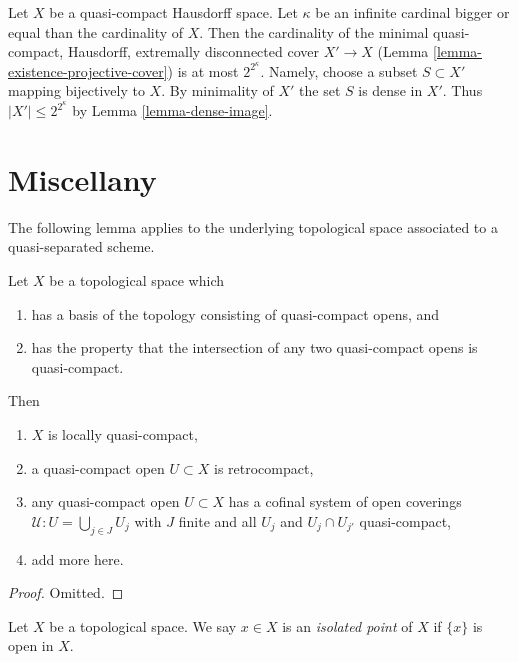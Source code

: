 \begin{remark}
\label{remark-size-projective-cover}
Let $X$ be a quasi-compact Hausdorff space. Let $\kappa$ be an infinite
cardinal bigger or equal than the cardinality of $X$. Then the cardinality
of the minimal quasi-compact, Hausdorff, extremally disconnected cover
$X' \to X$ (Lemma \ref{lemma-existence-projective-cover})
is at most $2^{2^\kappa}$. Namely, choose a subset $S \subset X'$
mapping bijectively to $X$. By minimality of $X'$ the set $S$ is dense
in $X'$. Thus $|X'| \leq 2^{2^\kappa}$ by Lemma \ref{lemma-dense-image}.
\end{remark}






\section{Miscellany}
\label{section-miscellany}


\noindent
The following lemma applies to the underlying topological space
associated to a quasi-separated scheme.

\begin{lemma}
\label{lemma-topology-quasi-separated-scheme}
Let $X$ be a topological space which
\begin{enumerate}
\item has a basis of the topology consisting of quasi-compact opens, and
\item has the property that the intersection of any two quasi-compact
opens is quasi-compact.
\end{enumerate}
Then
\begin{enumerate}
\item $X$ is locally quasi-compact,
\item a quasi-compact open $U \subset X$ is retrocompact,
\item any quasi-compact open $U \subset X$ has a cofinal system of open
coverings $\mathcal{U} : U = \bigcup_{j\in J} U_j$ with $J$ finite
and all $U_j$ and $U_j \cap U_{j'}$ quasi-compact,
\item add more here.
\end{enumerate}
\end{lemma}

\begin{proof}
Omitted.
\end{proof}

\begin{definition}
\label{definition-isolated-point}
Let $X$ be a topological space. We say $x \in X$ is an
{\it isolated point} of $X$ if $\{x\}$ is open in $X$.
\end{definition}



